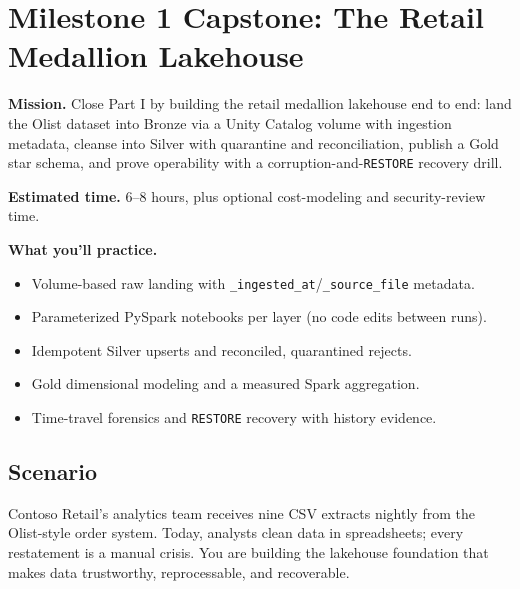 \section{Milestone 1 Capstone: The Retail Medallion Lakehouse}\label{sec:ch4-capstone}

\begin{capstonebox}
\textbf{Mission.} Close Part I by building the retail medallion lakehouse end to end: land the Olist dataset into Bronze via a Unity Catalog volume with ingestion metadata, cleanse into Silver with quarantine and reconciliation, publish a Gold star schema, and prove operability with a corruption-and-\texttt{RESTORE} recovery drill.

\textbf{Estimated time.} 6--8 hours, plus optional cost-modeling and security-review time.

\textbf{What you'll practice.}
\begin{itemize}
    \item Volume-based raw landing with \texttt{\_ingested\_at}/\texttt{\_source\_file} metadata.
    \item Parameterized PySpark notebooks per layer (no code edits between runs).
    \item Idempotent Silver upserts and reconciled, quarantined rejects.
    \item Gold dimensional modeling and a measured Spark aggregation.
    \item Time-travel forensics and \texttt{RESTORE} recovery with history evidence.
\end{itemize}
\end{capstonebox}

\subsection*{Scenario}
Contoso Retail's analytics team receives nine CSV extracts nightly from the Olist-style order system. Today, analysts clean data in spreadsheets; every restatement is a manual crisis. You are building the lakehouse foundation that makes data trustworthy, reprocessable, and recoverable.

